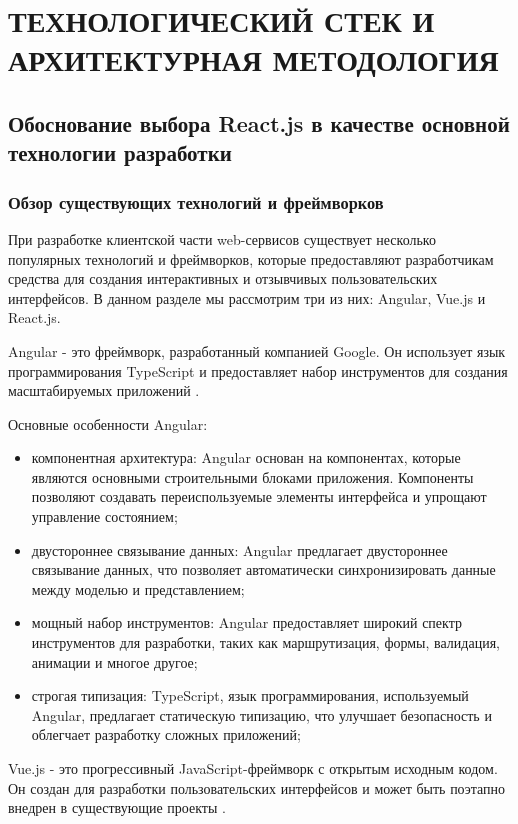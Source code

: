 \section{ТЕХНОЛОГИЧЕСКИЙ СТЕК И АРХИТЕКТУРНАЯ МЕТОДОЛОГИЯ}

\subsection{Обоснование выбора React.js в качестве основной технологии разработки}
\subsubsection{Обзор существующих технологий и фреймворков}

При разработке клиентской части web-сервисов существует несколько популярных технологий и фреймворков, которые предоставляют разработчикам средства для создания интерактивных и отзывчивых пользовательских интерфейсов. В данном разделе мы рассмотрим три из них: Angular, Vue.js и React.js.

Angular - это фреймворк, разработанный компанией Google. Он использует язык программирования TypeScript и предоставляет набор инструментов для создания масштабируемых приложений \cite{Angular}. 

Основные особенности Angular:

\begin{itemize}
    \item компонентная архитектура: Angular основан на компонентах, которые являются основными строительными блоками приложения. Компоненты позволяют создавать переиспользуемые элементы интерфейса и упрощают управление состоянием;
    \item двустороннее связывание данных: Angular предлагает двустороннее связывание данных, что позволяет автоматически синхронизировать данные между моделью и представлением;
    \item мощный набор инструментов: Angular предоставляет широкий спектр инструментов для разработки, таких как маршрутизация, формы, валидация, анимации и многое другое;
    \item строгая типизация: TypeScript, язык программирования, используемый Angular, предлагает статическую типизацию, что улучшает безопасность и облегчает разработку сложных приложений;
\end{itemize}

Vue.js - это прогрессивный JavaScript-фреймворк с открытым исходным кодом. Он создан для разработки пользовательских интерфейсов и может быть поэтапно внедрен в существующие проекты \cite{Vue.js}. 

